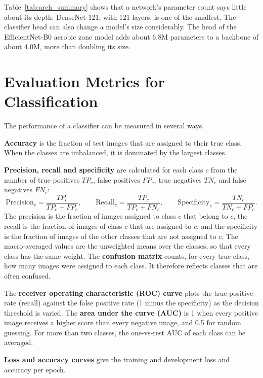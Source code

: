 Table~\ref{tab:arch_summary} shows that a network's parameter count says little about its depth: DenseNet-121, with 121 layers, is one of the smallest. The classifier head can also change a model's size considerably. The head of the EfficientNet-B0 aerobic zone model adds about 6.8M parameters to a backbone of about 4.0M, more than doubling its size.


\FloatBarrier
\section{Evaluation Metrics for Classification}\label{sec:metrics_background}

The performance of a classifier can be measured in several ways.

\textbf{Accuracy} is the fraction of test images that are assigned to their true class. When the classes are imbalanced, it is dominated by the largest classes.

\textbf{Precision, recall and specificity} are calculated for each class $c$ from the number of true positives $TP_c$, false positives $FP_c$, true negatives $TN_c$ and false negatives $FN_c$:
\begin{equation}
    \mathrm{Precision}_c = \frac{TP_c}{TP_c + FP_c}, \qquad
    \mathrm{Recall}_c = \frac{TP_c}{TP_c + FN_c}, \qquad
    \mathrm{Specificity}_c = \frac{TN_c}{TN_c + FP_c}.
\end{equation}
The precision is the fraction of images assigned to class $c$ that belong to $c$, the recall is the fraction of images of class $c$ that are assigned to $c$, and the specificity is the fraction of images of the other classes that are not assigned to $c$. The macro-averaged values are the unweighted means over the classes, so that every class has the same weight. The \textbf{confusion matrix} counts, for every true class, how many images were assigned to each class. It therefore reflects classes that are often confused. 

The \textbf{receiver operating characteristic (ROC) curve} plots the true positive rate (recall) against the false positive rate (1 minus the specificity) as the decision threshold is varied. The \textbf{area under the curve (AUC)} is 1 when every positive image receives a higher score than every negative image, and 0.5 for random guessing. For more than two classes, the one-vs-rest AUC of each class can be averaged.

\textbf{Loss and accuracy curves} give the training and development loss and accuracy per epoch.


